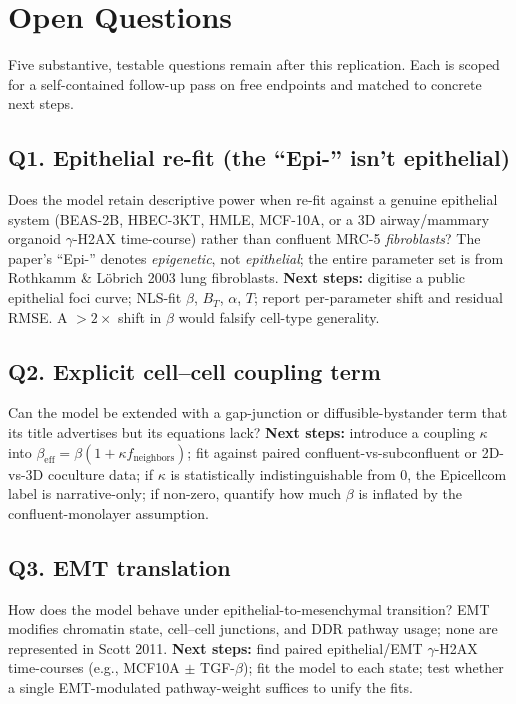 \section{Open Questions}
Five substantive, testable questions remain after this replication. Each is
scoped for a self-contained follow-up pass on free endpoints and matched to
concrete next steps.

\subsection*{Q1. Epithelial re-fit (the ``Epi-'' isn't epithelial)}
Does the model retain descriptive power when re-fit against a genuine
epithelial system (BEAS-2B, HBEC-3KT, HMLE, MCF-10A, or a 3D airway/mammary
organoid $\gamma$-H2AX time-course) rather than confluent MRC-5
\emph{fibroblasts}? The paper's ``Epi-'' denotes \emph{epigenetic}, not
\emph{epithelial}; the entire parameter set is from Rothkamm \& L\"obrich 2003
lung fibroblasts. \textbf{Next steps:} digitise a public epithelial foci
curve; NLS-fit $\beta$, $B_T$, $\alpha$, $T$; report per-parameter shift and
residual RMSE. A $>2\times$ shift in $\beta$ would falsify cell-type
generality.

\subsection*{Q2. Explicit cell--cell coupling term}
Can the model be extended with a gap-junction or diffusible-bystander term
that its title advertises but its equations lack? \textbf{Next steps:}
introduce a coupling $\kappa$ into $\beta_{\text{eff}} = \beta(1 + \kappa
f_{\text{neighbors}})$; fit against paired confluent-vs-subconfluent or
2D-vs-3D coculture data; if $\kappa$ is statistically indistinguishable
from 0, the Epicellcom label is narrative-only; if non-zero, quantify how
much $\beta$ is inflated by the confluent-monolayer assumption.

\subsection*{Q3. EMT translation}
How does the model behave under epithelial-to-mesenchymal transition? EMT
modifies chromatin state, cell--cell junctions, and DDR pathway usage; none
are represented in Scott 2011. \textbf{Next steps:} find paired
epithelial/EMT $\gamma$-H2AX time-courses (e.g., MCF10A $\pm$ TGF-$\beta$);
fit the model to each state; test whether a single EMT-modulated
pathway-weight suffices to unify the fits.

